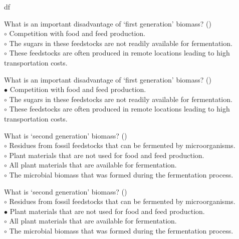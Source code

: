 df\documentclass[]{beamer}
\begin{document}
\begin{CJK}{UTF8}{gbsn}
\begin{frame}[shrink] {}
\addtocounter{questions}{1}
\color{blue}
What is an important disadvantage of ‘first generation’ biomass?
({})\\
\color{black}
\setlength{\parindent}{-0.4cm}
{\color{red}$\circ$}  Competition with food and feed production.  \\
{\color{red}$\circ$} The sugars in these feedstocks are not readily available for fermentation.  \\
{\color{red}$\circ$} These feedstocks are often produced in remote locations leading to high transportation costs.  \\
\end{frame}
\begin{frame}[shrink] {}
\addtocounter{answers}{1}
\color{blue}
What is an important disadvantage of ‘first generation’ biomass?
({})\\
\color{black}
\setlength{\parindent}{-0.4cm}
{\color{red}$\bullet$} Competition with food and feed production.  \\
{\color{red}$\circ$} The sugars in these feedstocks are not readily available for fermentation.  \\
{\color{red}$\circ$} These feedstocks are often produced in remote locations leading to high transportation costs.  \\
\end{frame}


\begin{frame}[shrink] {}
\addtocounter{questions}{1}
\color{blue}
What is ‘second generation’ biomass?
({})\\
\color{black}
\setlength{\parindent}{-0.4cm}
{\color{red}$\circ$} Residues from fossil feedstocks that can be fermented by microorganisms.  \\
{\color{red}$\circ$}  Plant materials that are not used for food and feed production.  \\
{\color{red}$\circ$} All plant materials that are available for fermentation.  \\
{\color{red}$\circ$} The microbial biomass that was formed during the fermentation process.  \\
\end{frame}
\begin{frame}[shrink] {}
\addtocounter{answers}{1}
\color{blue}
What is ‘second generation’ biomass?
({})\\
\color{black}
\setlength{\parindent}{-0.4cm}
{\color{red}$\circ$} Residues from fossil feedstocks that can be fermented by microorganisms.  \\
{\color{red}$\bullet$} Plant materials that are not used for food and feed production.  \\
{\color{red}$\circ$} All plant materials that are available for fermentation.  \\
{\color{red}$\circ$} The microbial biomass that was formed during the fermentation process.  \\
\end{frame}



\end{CJK}
\end{document}
